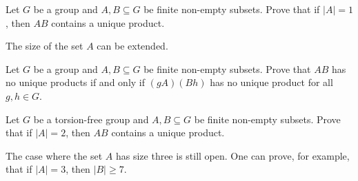 \begin{graybox}
\begin{xca}
\label{xca:A1Bm}
    Let $G$ be a group and $A,B\subseteq G$ be finite non-empty subsets. Prove that 
    if $|A|=1$, then $AB$ contains a unique product. 
\end{xca}




The size of the set $A$ can be extended. 

\begin{xca}
\label{xca:gABh}
    Let $G$ be a group and $A,B\subseteq G$ be finite non-empty subsets. Prove that
    $AB$ has no unique products 
    if and only if $(gA)(Bh)$ has no unique product for all $g,h\in G$. 
\end{xca}


\begin{xca}
\label{xca:A2Bm}
    Let $G$ be a torsion-free group and $A,B\subseteq G$ be finite non-empty subsets. Prove that 
    if $|A|=2$, then $AB$ contains a unique product. 
\end{xca}

The case where the set $A$ has size three is still open. One can prove, for example, 
that if $|A|=3$, then $|B|\geq7$. 






\end{graybox}
